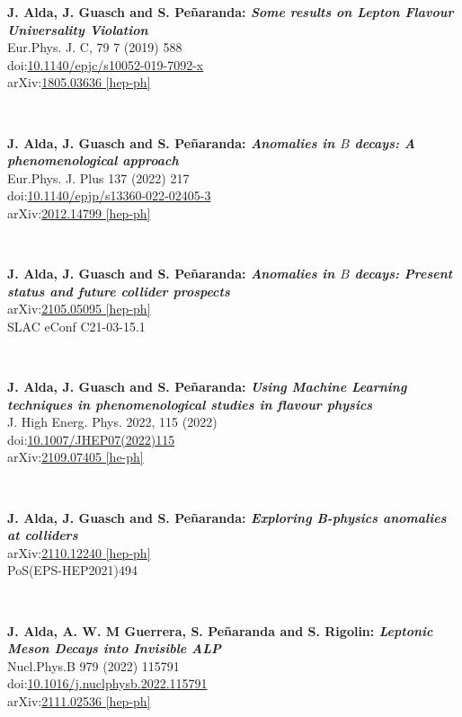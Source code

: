 \documentclass{cvf}
\begin{document}


\hspace{\parindent}
\textbf{J. Alda, J. Guasch and S. Peñaranda: \textit{Some results on Lepton Flavour Universality Violation}}\\
Eur.Phys. J. C, 79 7 (2019) 588\\
doi:\href{https://doi.org/10.1140/epjc/s10052-019-7092-x}{10.1140/epjc/s10052-019-7092-x}\\
arXiv:\href{https://arxiv.org/abs/1805.03636}{1805.03636 [hep-ph]}

~

\textbf{J. Alda, J. Guasch and S. Peñaranda: \textit{Anomalies in $B$ decays: A phenomenological approach}}\\
Eur.Phys. J. Plus 137 (2022) 217\\
doi:\href{https://doi.org/10.1140/epjp/s13360-022-02405-3}{10.1140/epjp/s13360-022-02405-3}\\
arXiv:\href{https://arxiv.org/abs/2012.14799}{2012.14799 [hep-ph]}

~

\textbf{J. Alda, J. Guasch and S. Peñaranda: \textit{Anomalies in $B$ decays: Present status and future collider prospects}}\\
arXiv:\href{https://arxiv.org/abs/2105.05095}{2105.05095 [hep-ph]}\\
SLAC eConf C21-03-15.1

~

\textbf{J. Alda, J. Guasch and S. Peñaranda: \textit{Using Machine Learning techniques in phenomenological studies in flavour physics}}\\
J. High Energ. Phys. 2022, 115 (2022)\\
doi:\href{https://doi.org/10.1007/JHEP07(2022)115}{10.1007/JHEP07(2022)115}\\
arXiv:\href{https://arxiv.org/abs/2109.07405}{2109.07405 [he-ph]}

~

\textbf{J. Alda, J. Guasch and S. Peñaranda: \textit{Exploring B-physics anomalies at colliders}}\\
arXiv:\href{https://arxiv.org/abs/2110.12240}{2110.12240 [hep-ph]}\\
PoS(EPS-HEP2021)494

~

\textbf{J. Alda, A. W. M Guerrera, S. Peñaranda and S. Rigolin: \textit{Leptonic Meson Decays into Invisible ALP}}\\
Nucl.Phys.B 979 (2022) 115791\\
doi:\href{https://doi.org/10.1016/j.nuclphysb.2022.115791}{10.1016/j.nuclphysb.2022.115791}\\
arXiv:\href{https://arxiv.org/abs/2111.02536}{2111.02536 [hep-ph]}
\end{document}
